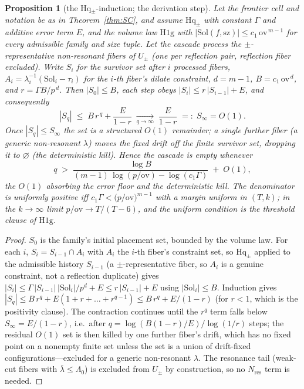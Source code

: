\documentclass[11pt,a4paper]{article}
\numberwithin{equation}{section}
\theoremstyle{plain}
\newtheorem{proposition}[theorem]{Proposition}
\theoremstyle{definition}
\theoremstyle{remark}
\begin{document}
\begin{proposition}[the Hq$_\pm$-induction; the derivation step]\label{prop:Hq}
Let the frontier cell and notation be as in Theorem~\ref{thm:SC}, and assume
$\mathrm{Hq}_\pm$ with constant $\Gamma$ and additive error term $E$, and the
volume law $\mathrm{H1g}$ with
$|\mathrm{Sol}(f,\mathrm{sz})|\le c_1\,\mathrm{ov}^{\,m-1}$ for every
admissible family and size tuple. Let the cascade process the
$\pm$-representative non-resonant fibers of $U_\pm$ (one per reflection pair,
reflection fiber excluded). Write $S_i$ for the survivor set after $i$
processed fibers, $A_i=\lambda_i^{-1}(\mathrm{Sol}_i-\tau_i)$ for the $i$-th
fiber's dilate constraint, $d=m-1$, $B=c_1\,\mathrm{ov}^{\,d}$, and
$r=\Gamma B/p^{\,d}$. Then $|S_0|\le B$, each step obeys
$|S_i|\le r\,|S_{i-1}|+E$, and consequently
\[
|S_q|\;\le\;B\,r^{\,q}+\frac{E}{1-r}\;\xrightarrow[q\to\infty]{}\;\frac{E}{1-r}
\;=:\;S_\infty=O(1).
\]
Once $|S_q|\le S_\infty$ the set is a structured $O(1)$ remainder; a single
further fiber (a generic non-resonant $\lambda$) moves the fixed drift off
the finite survivor set, dropping it to $\varnothing$ (the deterministic
kill). Hence the cascade is empty whenever
\[
q\;>\;\frac{\log B}{(m-1)\,\log(p/\mathrm{ov})-\log(c_1\Gamma)}\;+\;O(1),
\]
the $O(1)$ absorbing the error floor and the deterministic kill. The
denominator is uniformly positive iff
$c_1\Gamma<\bigl(p/\mathrm{ov}\bigr)^{m-1}$ with a margin uniform in
$(T,k)$; in the $k\to\infty$ limit $p/\mathrm{ov}\to T/(T-6)$, and the
uniform condition is the threshold clause of $\mathrm{H1g}$.
\end{proposition}

\begin{proof}
$S_0$ is the family's initial placement set, bounded by the volume law.
For each $i$, $S_i=S_{i-1}\cap A_i$ with $A_i$ the $i$-th fiber's
constraint set, so $\mathrm{Hq}_\pm$ applied to the admissible history
$S_{i-1}$ (a $\pm$-representative fiber, so $A_i$ is a genuine constraint,
not a reflection duplicate) gives
$|S_i|\le\Gamma\,|S_{i-1}|\,|\mathrm{Sol}_i|/p^{d}+E\le r\,|S_{i-1}|+E$
using $|\mathrm{Sol}_i|\le B$. Induction gives
$|S_q|\le B\,r^{q}+E(1+r+\dots+r^{q-1})\le B\,r^{q}+E/(1-r)$ (for $r<1$,
which is the positivity clause). The contraction continues until the
$r^{q}$ term falls below $S_\infty=E/(1-r)$, i.e.\ after
$q=\log(B(1-r)/E)/\log(1/r)$ steps; the residual $O(1)$ set is then killed
by one further fiber's drift, which has no fixed point on a nonempty finite
set unless the set is a union of drift-fixed configurations---excluded for a
generic non-resonant $\lambda$. The resonance tail (weak-cut fibers with
$\bar\lambda\le\Lambda_0$) is excluded from $U_\pm$ by construction, so no
$N_{\mathrm{res}}$ term is needed.
\end{proof}
\end{document}
